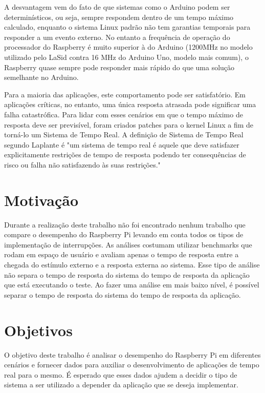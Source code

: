 A desvantagem vem do fato de que sistemas como o Arduino podem ser determinísticos, ou seja, sempre respondem dentro de um tempo máximo calculado, enquanto o sistema Linux padrão não tem garantias temporais para responder a um evento externo. No entanto a frequência de operação do processador do Raspberry é muito superior à do Arduino (1200MHz no modelo utilizado pelo LaSid contra 16 MHz do Arduino Uno, modelo mais comum), o Raspberry quase sempre pode responder mais rápido do que uma solução semelhante no Arduino.

Para a maioria das aplicações, este comportamento pode ser satisfatório. Em aplicações críticas, no entanto, uma única resposta atrasada pode significar uma falha catastrófica. Para lidar com esses cenários em que o tempo máximo de resposta deve ser previsível, foram criados patches para o kernel Linux a fim de torná-lo um Sistema de Tempo Real. A definição de Sistema de Tempo Real segundo Laplante \cite{Laplante2004} é "um sistema de tempo real é aquele que deve satisfazer explicitamente restrições de tempo de resposta podendo ter consequências de risco ou falha não satisfazendo às suas restrições."

\section{Motivação}

Durante a realização deste trabalho não foi encontrado nenhum trabalho que compare o desempenho do Raspberry Pi levando em conta todos os tipos de implementação de interrupções. As análises costumam utilizar benchmarks que rodam em espaço de usuário e avaliam apenas o tempo de resposta entre a chegada do estímulo externo e a resposta externa ao sistema. Esse tipo de análise não separa o tempo de resposta do sistema do tempo de resposta da aplicação que está executando o teste. Ao fazer uma análise em mais baixo nível, é possível separar o tempo de resposta do sistema do tempo de resposta da aplicação.

\section{Objetivos}

O objetivo deste trabalho é analisar o desempenho do Raspberry Pi em diferentes cenários e fornecer dados para auxiliar o desenvolvimento de aplicações de tempo real para o mesmo. É esperado que esses dados ajudem a decidir o tipo de sistema a ser utilizado a depender da aplicação que se deseja implementar.

